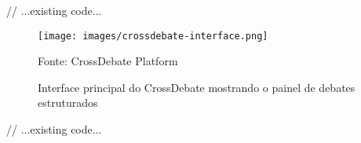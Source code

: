 // ...existing code...

\begin{figure}[htb]
  \centering
  \texttt{[image: images/crossdebate-interface.png]}
  \caption{Interface principal do CrossDebate mostrando o painel de debates estruturados}
  \label{fig:interface}
  \centering\footnotesize{Fonte: CrossDebate Platform}
\end{figure}

// ...existing code...